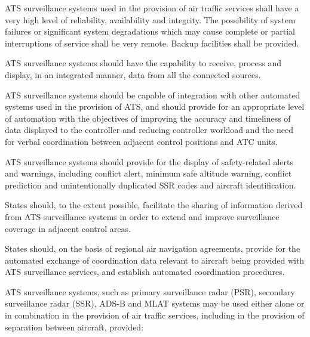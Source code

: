 \begin{enumnoss}
    \item ATS surveillance systems used in the provision of air traffic services shall have a very high level of reliability, availability and integrity. The possibility of system failures or significant system degradations which may cause complete or partial interruptions of service shall be very remote. Backup facilities shall be provided.
    \item ATS surveillance systems should have the capability to receive, process and display, in an integrated manner, data from all the connected sources.
    \item ATS surveillance systems should be capable of integration with other automated systems used in the provision of ATS, and should provide for an appropriate level of automation with the objectives of improving the accuracy and timeliness of data displayed to the controller and reducing controller workload and the need for verbal coordination between adjacent control positions and ATC units.
    \item ATS surveillance systems should provide for the display of safety-related alerts and warnings, including conflict alert, minimum safe altitude warning, conflict prediction and unintentionally duplicated SSR codes and aircraft identification.
    \item States should, to the extent possible, facilitate the sharing of information derived from ATS surveillance systems in order to extend and improve surveillance coverage in adjacent control areas.
    \item States should, on the basis of regional air navigation agreements, provide for the automated exchange of coordination data relevant to aircraft being provided with ATS surveillance services, and establish automated coordination procedures.
    \item ATS surveillance systems, such as primary surveillance radar (PSR), secondary surveillance radar (SSR), ADS-B and MLAT systems may be used either alone or in combination in the provision of air traffic services, including in the provision of separation between aircraft, provided:


\end{enumnoss}
